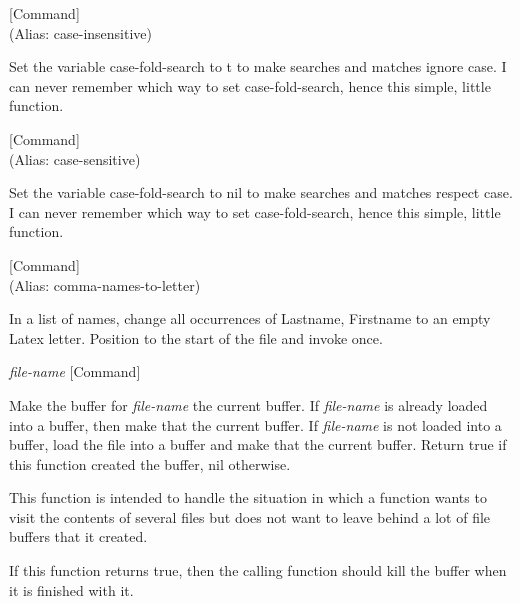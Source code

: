 \vspace{1em}
\noindent
{}
\usebox{\funcname}
 \hfill [Command]\\%
 (Alias: case-insensitive)

\begin{doc-string}
Set the variable case-fold-search to t to make searches and matches ignore
case.  I can never remember which way to set case-fold-search, hence this
simple, little function.
\end{doc-string}

\vspace{1em}
\noindent
{}
\usebox{\funcname}
 \hfill [Command]\\%
 (Alias: case-sensitive)

\begin{doc-string}
Set the variable case-fold-search to nil to make searches and matches respect
case.  I can never remember which way to set case-fold-search, hence this
simple, little function.
\end{doc-string}

\vspace{1em}
\noindent
{}
\usebox{\funcname}
 \hfill [Command]\\%
 (Alias: comma-names-to-letter)

\begin{doc-string}
In a list of names, change all occurrences
of Lastname, Firstname to an empty Latex letter.
Position to the start of the file and invoke once.
\end{doc-string}

\vspace{1em}
\noindent
{}
\usebox{\funcname}\emph{file-name}
 \hfill [Command]

\begin{doc-string}
Make the buffer for \emph{file-name} the current buffer.  If \emph{file-name} is already
loaded into a buffer, then make that the current buffer.  If \emph{file-name} is not
loaded into a buffer, load the file into a buffer and make that the current
buffer.  Return true if this function created the buffer, nil otherwise.

This function is intended to handle the situation in which a function wants
to visit the contents of several files but does not want to leave behind a
lot of file buffers that it created.

If this function returns true, then the calling function should kill the
buffer when it is finished with it.
\end{doc-string}

